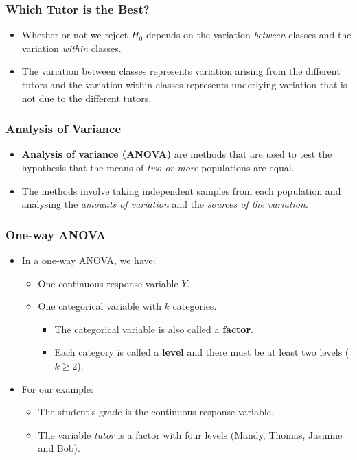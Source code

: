 \documentclass[12pt]{beamer}
\begin{document}
\begin{frame}
	\frametitle{Which Tutor is the Best?}
	
	\begin{itemize}[label={\color{blue}$\blacktriangleright$}]
		\item Whether or not we reject $H_0$ depends on the variation \textit{between} classes and the variation \textit{within} classes.
		
		\item The variation between classes represents variation arising from the different tutors and the variation within classes represents underlying variation that is not due to the different tutors.
	\end{itemize}
	
\end{frame}
\begin{frame}
	\frametitle{Analysis of Variance}
	
	\begin{itemize}[label={\color{blue}$\blacktriangleright$}]
		\item \textbf{Analysis of variance (ANOVA)} are methods that are used to test the hypothesis that the means of \textit{two or more} populations are equal.
		
		\item The methods involve taking independent samples from each population and analysing the \textit{amounts of variation} and the \textit{sources of the variation}.
	\end{itemize}
	
\end{frame}
\begin{frame}
	\frametitle{One-way ANOVA}
	
	\begin{itemize}[label={\color{blue}$\blacktriangleright$}]
		\item In a one-way ANOVA, we have:
		\begin{itemize}[label={\color{blue}$\blacktriangleright$}]
			\item One continuous response variable $Y$.
			\item One categorical variable with $k$ categories.
			\begin{itemize}[label={\color{blue}$\blacktriangleright$}]
				\item The categorical variable is also called a \textbf{factor}.
				\item Each category is called a \textbf{level} and there must be at least two levels ($k \geq 2$).
			\end{itemize}
		\end{itemize}
		\item For our example:
		\begin{itemize}[label={\color{blue}$\blacktriangleright$}]
			\item The student's grade is the continuous response variable.
			\item The variable \textit{tutor} is a factor with four levels (Mandy, Thomas, Jasmine and Bob).
		\end{itemize}
	\end{itemize}
	
\end{frame}
\end{document}
